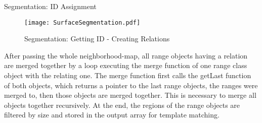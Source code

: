 \begin{algorithm}[H]

	\begin{algorithmic}
	
		\Else
		\EndIf
		
		\EndIf
		
		\EndIf
		
		\EndIf
\EndFor
	\end{algorithmic}
 \caption{Segmentation: ID Assignment}
 \label{alg:IDs}
\end{algorithm}


\begin{figure}[H]
\begin{center}
  \texttt{[image: SurfaceSegmentation.pdf]}
  \caption{Segmentation: Getting ID - Creating Relations}
  \label{figure:segment}
\end{center}
\end{figure}

After passing the whole neighborhood-map, all range objects having a relation are merged together
by a loop executing the merge function of one range class object with the relating one.
The merge function first calls the getLast function of both objects, which returns a pointer to the
last range objects, the ranges were merged to, then those objects are merged together. 
This is necessary to merge all objects together recursively. At the end, the regions of the range objects are 
filtered by size and stored in the output array for template matching. 

